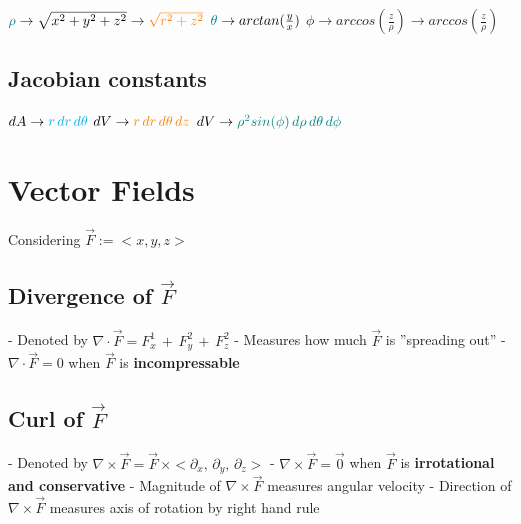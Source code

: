\documentclass[12pt, letterpaper]{article}
\begin{document}
  \noindent $\textcolor{teal}{\rho} \rightarrow \sqrt{x^{2} + y^{2} + z^{2}} \rightarrow \textcolor{orange}{\sqrt{r^{2} + z^{2}}}$ \newline
  $\textcolor{teal}{\theta} \rightarrow arctan(\frac{y}{x})$ \newline
  $\phi \rightarrow arccos(\frac{z}{\rho}) \rightarrow arccos(\frac{z}{\rho})$ \newline

  \subsection*{Jacobian constants}

  $dA \rightarrow \textcolor{cyan}{r\,dr\,d\theta}$ \newline
  $dV \rightarrow \textcolor{orange}{r\,dr\,d\theta\,dz}$ \newline
  $dV \rightarrow \textcolor{teal}{\rho^{2}sin(\phi)\,d\rho\,d\theta\,d\phi}$

\pagebreak

  \section*{Vector Fields}
  Considering $ \vec{F} := <x, y, z>$

  \subsection*{Divergence of $\vec{F}$}

  - Denoted by $\nabla \cdot \vec{F} = F_{x}^{1}\,+\,F_{y}^{2}\,+\,F_{z}^{2}$ \newline
  - Measures how much $\vec{F}$ is ''spreading out''
  - $\nabla \cdot \vec{F} = 0$ when $\vec{F}$ is \textbf{incompressable}
  
  \subsection*{Curl of $\vec{F}$}
  - Denoted by $\nabla \times \vec{F} = \vec{F} \, \times <\partial_x ,\, \partial_y ,\, \partial_z >$ \newline
  - $\nabla \times \vec{F} = \vec{0}$ when $\vec{F}$ is \textbf{irrotational and conservative} \newline
  - Magnitude of $\nabla \times \vec{F}$ measures angular velocity \newline
  - Direction of $\nabla \times \vec{F}$ measures axis of rotation by right hand rule \newline
\end{document}
